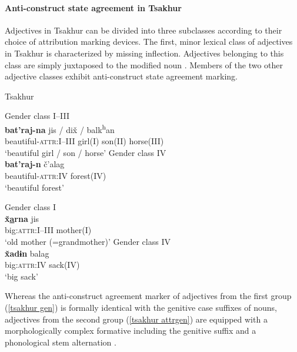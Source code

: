 \paragraph*{Anti\hyp{}construct state agreement in Tsakhur}
Adjectives in Tsakhur can be divided into three subclasses according to their choice of attribution marking devices. The first, minor lexical class of adjectives in Tsakhur is characterized by missing inflection. Adjectives belonging to this class are simply juxtaposed to the modified noun \citep[383]{talibov2004}. Members of the two other adjective classes exhibit anti\hyp{}construct state agreement marking.
\begin{exe}
\ex 
\rm{Tsakhur \citep[382]{talibov2004}}
\begin{xlist}
\ex	
\label{tsakhur gen}
\begin{xlist}
\ex \rm{Gender class I–III}\\
\gll	\textbf{bat'raj-na} jis / dix̌ / balk\textsuperscript{h}an\\
	 beautiful-\textsc{attr:I–III} girl(\textsc{I}) { } son(\textsc{II}) { } horse(\textsc{III})\\
\glt	 ‘beautiful girl / son / horse’
\ex \rm{Gender class IV}\\
\gll	\textbf{bat'raj-n}	č'alag\\
	beautiful-\textsc{attr:IV} forest(\textsc{IV})\\
\glt	‘beautiful forest’
\end{xlist}
\ex 
\label{tsakhur attrgen}
\begin{xlist}
\ex \rm{Gender class I}\\
\gll	\textbf{x̌\underline{a}rna} jis\\
	big:\textsc{attr:I–III} mother(\textsc{I})\\
\glt	‘old mother (=grandmother)’
\ex \rm{Gender class IV}\\
\gll	\textbf{x̌adɨn} balag\\
	big:\textsc{attr:IV} sack(\textsc{IV})\\
\glt	‘big sack’
\end{xlist}
\end{xlist}
\end{exe}
Whereas the anti\hyp{}construct agreement marker of adjectives from the first group (\ref{tsakhur gen}) is formally identical with the genitive case suffixes of nouns, adjectives from the second group (\ref{tsakhur attrgen}) are equipped with a morphologically complex formative including the genitive suffix and a phonological stem alternation \citep[382]{talibov2004}.

